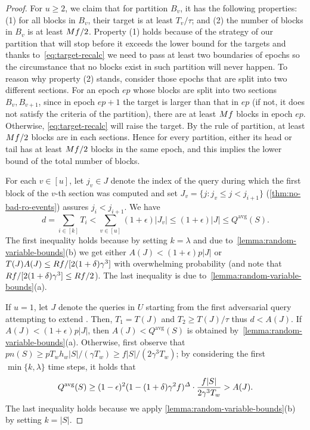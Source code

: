 \begin{proof}
    For $u \ge 2$, we claim that for partition $B_v$, it has the following properties: (1) for all blocks in $B_v$, their target is at least $T_v / \tau$; and (2) the number of blocks in $B_v$ is at least $M f / 2$.
    Property (1) holds because of the strategy of our partition that will stop before it exceeds the lower bound for the targets and thanks to~\cref{eq:target-recalc} we need to pass at least two boundaries of epochs so the circumstance that no blocks exist in such partition will never happen.
    To reason why property (2) stands, consider those epochs that are split into two different sections.
    For an epoch $ep$ whose blocks are split into two sections $B_v, B_{v + 1}$, since in epoch $ep + 1$ the target is larger than that in $ep$ (if not, it does not satisfy the criteria of the partition), there are at least $M f$ blocks in epoch $ep$.
    Otherwise, \cref{eq:target-recalc} will raise the target.
    By the rule of partition, at least $M f / 2$ blocks are in each sections.
    Hence for every partition, either its head or tail has at least $M f / 2$ blocks in the same epoch, and this implies the lower bound of the total number of blocks.

    For each $v \in [u]$, let $j_v \in J$ denote the index of the query during which the first block of the $v$-th section was computed and set $J_v = \{j : j_v \le j < j_{i+1} \}$ (\cref{thm:no-bad-ro-events}) assures $j_i < j_{i + 1}$.
    We have
    \[ d = \sum_{i \in [k]} T_i < \sum_{v \in [u]} (1 + \epsilon) |J_v| \le (1 + \epsilon) |J| \le Q^{\mathrm{avg}}(S). \]
    The first inequality holds because by setting $k = \lambda$ and due to~\cref{lemma:random-variable-bounds}(b) we get either $A(J) < (1 + \epsilon) p |J|$ or $T(J) A(J) \le R f / [2(1 + \delta) \gamma^3]$ with overwhelming probability (and note that $R f / [2(1 + \delta) \gamma^3] \le R f / 2$).
    The last inequality is due to~\cref{lemma:random-variable-bounds}(a).

    If $u = 1$, let $J$ denote the queries in $U$ starting from the first adversarial query attempting to extend \block.
    Then, $T_1 = T(J)$ and $T_2 \ge T(J) / \tau$ thus $d < A(J)$.
    If $A(J) < (1 + \epsilon) p |J|$, then $A(J) < Q^{\mathrm{avg}}(S)$ is obtained by~\cref{lemma:random-variable-bounds}(a).
    Otherwise, first observe that $pn(S) \ge p T_w h_w |S| / (\gamma T_w) \ge f |S| / (2\gamma^3 T_w)$; by considering the first $\min \{k, \lambda \}$ time steps, it holds that
    \[ Q^{\mathrm{avg}}(S) \ge (1 - \epsilon)^2(1 - (1 + \delta) \gamma^2 f)^\varDelta \cdot \frac{f |S|}{2\gamma^3 T_w} > A(J). \]
    The last inequality holds because we apply \cref{lemma:random-variable-bounds}(b) by setting $k = |S|$.
\end{proof}

